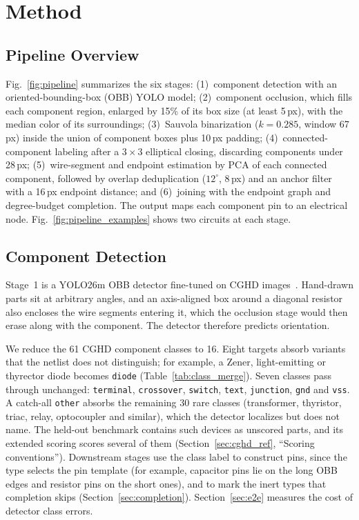 \documentclass[journal]{IEEEtran}
\begin{document}
\section{Method}
\label{sec:method}

\subsection{Pipeline Overview}

Fig.~\ref{fig:pipeline} summarizes the six stages: (1)~component detection with an oriented-bounding-box (OBB) YOLO model; (2)~component occlusion, which fills each component region, enlarged by 15\% of its box size (at least 5\,px), with the median color of its surroundings; (3)~Sauvola binarization ($k=0.285$, window 67\,px) inside the union of component boxes plus 10\,px padding; (4)~connected-component labeling after a $3\times3$ elliptical closing, discarding components under 28\,px; (5)~wire-segment and endpoint estimation by PCA of each connected component, followed by overlap deduplication ($12^{\circ}$, 8\,px) and an anchor filter with a 16\,px endpoint distance; and (6)~joining with the endpoint graph and degree-budget completion. The output maps each component pin to an electrical node. Fig.~\ref{fig:pipeline_examples} shows two circuits at each stage.

\subsection{Component Detection}
\label{sec:component_detection}

Stage~1 is a YOLO26m OBB detector fine-tuned on CGHD images~\cite{bayer2021cghd,cghd1152data}. Hand-drawn parts sit at arbitrary angles, and an axis-aligned box around a diagonal resistor also encloses the wire segments entering it, which the occlusion stage would then erase along with the component. The detector therefore predicts orientation.

We reduce the 61 CGHD component classes to 16. Eight targets absorb variants that the netlist does not distinguish; for example, a Zener, light-emitting or thyrector diode becomes \texttt{diode} (Table~\ref{tab:class_merge}). Seven classes pass through unchanged: \texttt{terminal}, \texttt{crossover}, \texttt{switch}, \texttt{text}, \texttt{junction}, \texttt{gnd} and \texttt{vss}. A catch-all \texttt{other} absorbs the remaining 30 rare classes (transformer, thyristor, triac, relay, optocoupler and similar), which the detector localizes but does not name. The held-out benchmark contains such devices as unscored parts, and its extended scoring scores several of them (Section~\ref{sec:cghd_ref}, ``Scoring conventions''). Downstream stages use the class label to construct pins, since the type selects the pin template (for example, capacitor pins lie on the long OBB edges and resistor pins on the short ones), and to mark the inert types that completion skips (Section~\ref{sec:completion}). Section~\ref{sec:e2e} measures the cost of detector class errors.
\end{document}

